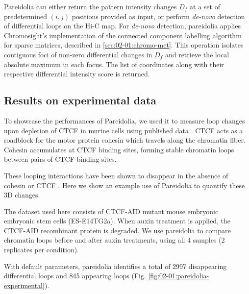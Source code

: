 Pareidolia can either return the pattern intensity changes $D_f$ at a set of predetermined $(i, j)$ positions provided as input, or perform \textit{de-novo} detection of differential loops on the Hi-C map. For \textit{de-novo} detection, pareidolia applies Chromosight's implementation of the connected component labelling algorithm for sparse matrices, described in \ref{sec:02-01:chromo-met}. This operation isolates contiguous foci of non-zero differential changes in $D_f$ and retrieve the local absolute maximum in each focus. The list of coordinates along with their respective differential intensity score is returned.

\subsection{Results on experimental data}

To showcase the performances of Pareidolia, we used it to measure loop changes upon depletion of CTCF in murine cells using published data \cite{noraTargetedDegradationCTCF2017}. CTCF acts as a roadblock for the motor protein cohesin which travels along the chromatin fiber. Cohesin accumulates at CTCF binding sites, forming stable chromatin loops between pairs of CTCF binding sites.

These looping interactions have been shown to disappear in the absence of cohesin \cite{raoCohesinLossEliminates2017} or CTCF \cite{noraTargetedDegradationCTCF2017}. Here we show an example use of Pareidolia to quantify these 3D changes.

The dataset used here consists of CTCF-AID mutant mouse embryonic embryonic stem cells (ES-E14TG2a). When auxin treatment is applied, the CTCF-AID recombinant protein is degraded. We use pareidolia to compare chromatin loops before and after auxin treatments, using all 4 samples (2 replicates per condition).

With default parameters, pareidolia identifies a total of 2997 disappearing differential loops and 845 appearing loops (Fig. \ref{fig:02-01:pareidolia-experimental}).


